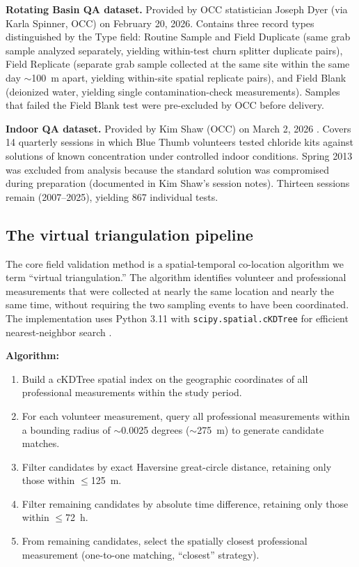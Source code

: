 \documentclass[lineno]{wlpeerj}
\begin{document}
\textbf{Rotating Basin QA dataset.} Provided by OCC statistician Joseph Dyer (via Karla Spinner, OCC) on February 20, 2026. Contains three record types distinguished by the Type field: Routine Sample and Field Duplicate (same grab sample analyzed separately, yielding within-test churn splitter duplicate pairs), Field Replicate (separate grab sample collected at the same site within the same day $\sim$100~m apart, yielding within-site spatial replicate pairs), and Field Blank (deionized water, yielding single contamination-check measurements). Samples that failed the Field Blank test were pre-excluded by OCC before delivery.

\textbf{Indoor QA dataset.} Provided by Kim Shaw (OCC) on March 2, 2026 \citep{Shaw2026}. Covers 14 quarterly sessions in which Blue Thumb volunteers tested chloride kits against solutions of known concentration under controlled indoor conditions. Spring 2013 was excluded from analysis because the standard solution was compromised during preparation (documented in Kim Shaw's session notes). Thirteen sessions remain (2007--2025), yielding 867 individual tests.

\subsection{The virtual triangulation pipeline}

The core field validation method is a spatial-temporal co-location algorithm we term ``virtual triangulation.'' The algorithm identifies volunteer and professional measurements that were collected at nearly the same location and nearly the same time, without requiring the two sampling events to have been coordinated. The implementation uses Python 3.11 with \texttt{scipy.spatial.cKDTree} for efficient nearest-neighbor search \citep{Virtanen2020}.

\textbf{Algorithm:}
\begin{enumerate}
  \item Build a cKDTree spatial index on the geographic coordinates of all professional measurements within the study period.
  \item For each volunteer measurement, query all professional measurements within a bounding radius of $\sim$0.0025 degrees ($\sim$275~m) to generate candidate matches.
  \item Filter candidates by exact Haversine great-circle distance, retaining only those within $\leq$125~m.
  \item Filter remaining candidates by absolute time difference, retaining only those within $\leq$72~h.
  \item From remaining candidates, select the spatially closest professional measurement (one-to-one matching, ``closest'' strategy).
\end{enumerate}
\end{document}
